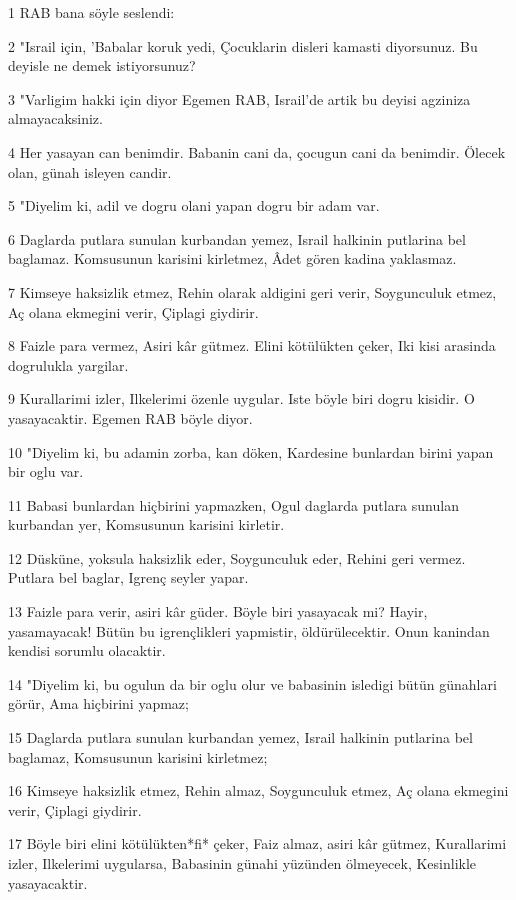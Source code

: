 \par 1 RAB bana söyle seslendi:
\par 2 "Israil için, 'Babalar koruk yedi, Çocuklarin disleri kamasti diyorsunuz. Bu deyisle ne demek istiyorsunuz?
\par 3 "Varligim hakki için diyor Egemen RAB, Israil'de artik bu deyisi agziniza almayacaksiniz.
\par 4 Her yasayan can benimdir. Babanin cani da, çocugun cani da benimdir. Ölecek olan, günah isleyen candir.
\par 5 "Diyelim ki, adil ve dogru olani yapan dogru bir adam var.
\par 6 Daglarda putlara sunulan kurbandan yemez, Israil halkinin putlarina bel baglamaz. Komsusunun karisini kirletmez, Âdet gören kadina yaklasmaz.
\par 7 Kimseye haksizlik etmez, Rehin olarak aldigini geri verir, Soygunculuk etmez, Aç olana ekmegini verir, Çiplagi giydirir.
\par 8 Faizle para vermez, Asiri kâr gütmez. Elini kötülükten çeker, Iki kisi arasinda dogrulukla yargilar.
\par 9 Kurallarimi izler, Ilkelerimi özenle uygular. Iste böyle biri dogru kisidir. O yasayacaktir. Egemen RAB böyle diyor.
\par 10 "Diyelim ki, bu adamin zorba, kan döken, Kardesine bunlardan birini yapan bir oglu var.
\par 11 Babasi bunlardan hiçbirini yapmazken, Ogul daglarda putlara sunulan kurbandan yer, Komsusunun karisini kirletir.
\par 12 Düsküne, yoksula haksizlik eder, Soygunculuk eder, Rehini geri vermez. Putlara bel baglar, Igrenç seyler yapar.
\par 13 Faizle para verir, asiri kâr güder. Böyle biri yasayacak mi? Hayir, yasamayacak! Bütün bu igrençlikleri yapmistir, öldürülecektir. Onun kanindan kendisi sorumlu olacaktir.
\par 14 "Diyelim ki, bu ogulun da bir oglu olur ve babasinin isledigi bütün günahlari görür, Ama hiçbirini yapmaz;
\par 15 Daglarda putlara sunulan kurbandan yemez, Israil halkinin putlarina bel baglamaz, Komsusunun karisini kirletmez;
\par 16 Kimseye haksizlik etmez, Rehin almaz, Soygunculuk etmez, Aç olana ekmegini verir, Çiplagi giydirir.
\par 17 Böyle biri elini kötülükten*fi* çeker, Faiz almaz, asiri kâr gütmez, Kurallarimi izler, Ilkelerimi uygularsa, Babasinin günahi yüzünden ölmeyecek, Kesinlikle yasayacaktir.
